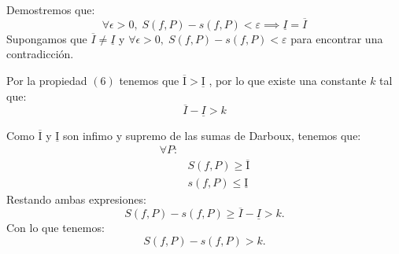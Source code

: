 \documentclass[10pt]{article}
\begin{document}
Demostremos que:
\begin{equation}
\forall \epsilon > 0,\;  S(f,P)-s(f,P) < \varepsilon \implies \underline{I} =\overline{I}
\end{equation}
Supongamos que $\overline{I} \neq \underline{I}$ y $\forall \epsilon > 0,\;  S(f,P)-s(f,P) < \varepsilon$ para encontrar una contradicción.

 Por la propiedad $(6)$ tenemos que $\overline{\mathrm{I}} > \underline{\mathrm{I}}$ , por lo que existe una constante $k$ tal que:
\begin{equation}
   \overline{I} -\underline{I}>k
\end{equation}

Como $\overline{\mathrm{I}}$ y $\underline{\mathrm{I}}$ son infimo y supremo de las sumas de Darboux, tenemos que:
		\begin{align*}
			\forall P:&\\
			&S(f, P) \geq \overline{\mathrm{I}} \\
			&s(f, P) \leq \underline{\mathrm{I}}
		\end{align*}
Restando ambas expresiones:
\begin{equation}
    S(f, P) - s(f, P) \geq \overline{I}- \underline{I}> k.
\end{equation}
Con lo que tenemos:
\begin{equation}
    S(f, P) - s(f, P) > k.
\end{equation}
\end{document}
